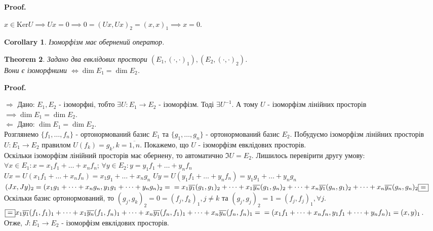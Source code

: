 \documentclass[a4paper, 10pt]{article}
\makeatletter
\def\qed{$\blacksquare$}
\def\ker#1{\textrm{Ker} {#1}}
\def\rightproof{$\boxed{\Rightarrow}$ }
\def\leftproof{$\boxed{\Leftarrow}$ }
\theoremstyle{theoremdd}
\newtheorem{theorem}{Theorem}[subsection]
\theoremstyle{theoremdd}
\theoremstyle{theoremdd}
\theoremstyle{theoremdd}
\theoremstyle{theoremdd}
\theoremstyle{theoremdd}
\theoremstyle{theoremdd}
\theoremstyle{theoremdd}
\newtheorem{corollary}[theorem]{Corollary}
\renewenvironment{proof}[1][Proof.\\]{\par
\pushQED{\hfill \qed}%
\normalfont \topsep6\p@\@plus6\p@\relax
\trivlist
\item\relax
{\bfseries
#1\@addpunct{.}}\hspace\labelsep\ignorespaces
}{%
\popQED\endtrivlist\@endpefalse
}
\makeatother
\begin{document}
\begin{proof}
$x \in \ker U \implies Ux = 0 \implies 0 = (Ux,Ux)_2 = (x,x)_1 \implies x = 0$.
\end{proof}

\begin{corollary}
Ізоморфізм має обернений оператор.
\end{corollary}

\begin{theorem}
Задано два евклідових простори $(E_1,(\cdot,\cdot)_1), (E_2,(\cdot,\cdot)_2)$.\\
Вони є ізоморфними $\iff \dim E_1 = \dim E_2$.
\end{theorem}

\begin{proof}
\rightproof Дано: $E_1,E_2$ - ізоморфні, тобто $\exists U: E_1 \to E_2$ - ізоморфізм. Тоді $\exists U^{-1}$. А тому $U$ - ізоморфізм лінійних просторів $\implies \dim E_1 = \dim E_2$.
\bigskip \\
\leftproof Дано: $\dim E_1 = \dim E_2$.\\
Розглянемо $\{f_1,\dots,f_n\}$ - ортонормований базис $E_1$ та $\{g_1,\dots,g_n\}$ - ортонормований базис $E_2$.
Побудуємо ізоморфізм лінійних просторів $U: E_1 \to E_2$ правилом $U(f_k) = g_k, k = \overline{1,n}$. Покажемо, що $U$ - ізоморфізм евклідових просторів.\\
Оскільки ізоморфізм лінійний просторів має обернену, то автоматично $\Im U = E_2$. Лишилось перевірити другу умову:\\
$\forall x \in E_1: x = x_1 f_1 + \dots + x_n f_n$; \hspace{3.2cm} $\forall y \in E_2: y = y_1 f_1 + \dots + y_n f_n$\\
$Ux = U(x_1 f_1+\dots+x_n f_n) = x_1 g_1 + \dots + x_n g_n$ \hspace{1cm} $Uy = U(y_1 f_1+\dots+y_n f_n) = y_1 g_1 + \dots + y_n g_n$\\
$(Jx,Jy)_2 = (x_1 g_1+\dots+x_n g_n, y_1 g_1 + \dots + y_n g_n)_2 = \\
= x_1 \overline{y_1} (g_1,g_1)_2 + \dots + x_1 \overline{y_n} (g_1,g_n)_2 + \dots + x_n \overline{y_1} (g_n, g_1)_2 + \dots + x_n \overline{y_n} (g_n,g_n)_2 \boxed{=}$\\
Оскільки базис ортонормований, то $(g_j,g_k)_2 = 0 = (f_j,f_k)_1, j \neq k$ та $(g_j,g_j)_2 = 1 = (f_j,f_j)_1, \forall j$.\\
$\boxed{=} x_1 \overline{y_1} (f_1,f_1)_1 + \dots + x_1 \overline{y_n} (f_1,f_n)_1 + \dots + x_n \overline{y_1} (f_n, f_1)_1 + \dots + x_n \overline{y_n} (f_n,f_n)_1 = \\
= (x_1f_1+\dots+x_nf_n, y_1f_1+\dots+y_nf_n)_1 = (x,y)_1$.\\
Отже, $J: E_1 \to E_2$ - ізоморфізм евклідових просторів.
\end{proof}
\end{document}
